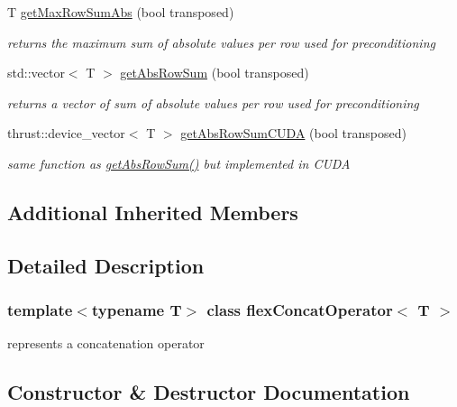 \begin{DoxyCompactItemize}
T \hyperlink{classflex_concat_operator_a39b7aa1797025fb022630a63358a4072}{get\+Max\+Row\+Sum\+Abs} (bool transposed)
\begin{DoxyCompactList}\small\item\em returns the maximum sum of absolute values per row used for preconditioning \end{DoxyCompactList}\item 
std\+::vector$<$ T $>$ \hyperlink{classflex_concat_operator_a6cae0c9545cf1afd8ac0ebc418fa3327}{get\+Abs\+Row\+Sum} (bool transposed)
\begin{DoxyCompactList}\small\item\em returns a vector of sum of absolute values per row used for preconditioning \end{DoxyCompactList}\item 
thrust\+::device\+\_\+vector$<$ T $>$ \hyperlink{classflex_concat_operator_a76e35865b16975bfcd6431879bda195b}{get\+Abs\+Row\+Sum\+C\+U\+DA} (bool transposed)
\begin{DoxyCompactList}\small\item\em same function as \hyperlink{classflex_concat_operator_a6cae0c9545cf1afd8ac0ebc418fa3327}{get\+Abs\+Row\+Sum()} but implemented in C\+U\+DA \end{DoxyCompactList}\end{DoxyCompactItemize}
\subsection*{Additional Inherited Members}


\subsection{Detailed Description}
\subsubsection*{template$<$typename T$>$\newline
class flex\+Concat\+Operator$<$ T $>$}

represents a concatenation operator 

\subsection{Constructor \& Destructor Documentation}
\mbox{\label{classflex_concat_operator_aa0b80af6e02e39f68c5d2a07f5e7503d}} 
